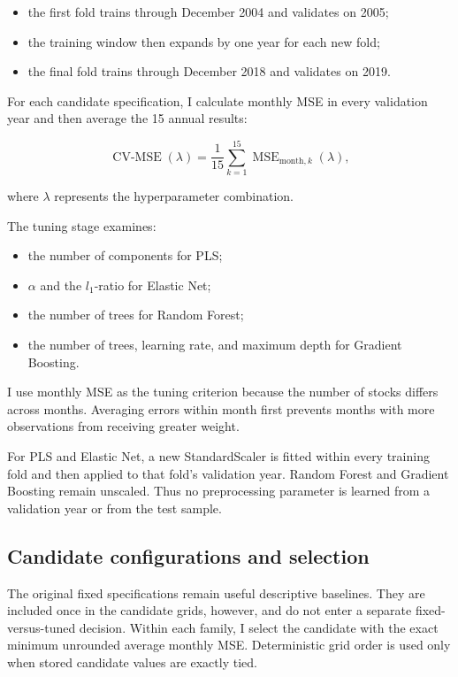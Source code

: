 \documentclass[11pt,a4paper]{article}
\begin{document}
\begin{itemize}
  \item the first fold trains through December 2004 and validates on 2005;
  \item the training window then expands by one year for each new fold;
  \item the final fold trains through December 2018 and validates on 2019.
\end{itemize}

For each candidate specification, I calculate monthly MSE in every validation
year and then average the 15 annual results:

\begin{equation}
 \operatorname{CV\text{-}MSE}(\lambda)
 =
 \frac{1}{15}
 \sum_{k=1}^{15}
 \operatorname{MSE}_{\mathrm{month},k}(\lambda),
 \label{eq:cv-mse}
\end{equation}

where \(\lambda\) represents the hyperparameter combination.

The tuning stage examines:

\begin{itemize}
  \item the number of components for PLS;
  \item \(\alpha\) and the \(l_1\)-ratio for Elastic Net;
  \item the number of trees for Random Forest;
  \item the number of trees, learning rate, and maximum depth for Gradient
        Boosting.
\end{itemize}

I use monthly MSE as the tuning criterion because the number of stocks differs
across months. Averaging errors within month first prevents months with more
observations from receiving greater weight.

For PLS and Elastic Net, a new StandardScaler is fitted within every training
fold and then applied to that fold's validation year. Random Forest and Gradient
Boosting remain unscaled. Thus no preprocessing parameter is learned from a
validation year or from the test sample.

\subsection{Candidate configurations and selection}

The original fixed specifications remain useful descriptive baselines. They are
included once in the candidate grids, however, and do not enter a separate
fixed-versus-tuned decision. Within each family, I select the candidate with the
exact minimum unrounded average monthly MSE. Deterministic grid order is used
only when stored candidate values are exactly tied.
\end{document}
